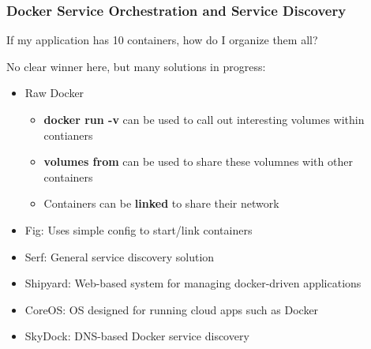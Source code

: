 \documentclass[xcolor=dvipsnames]{beamer}
\newcommand{\cpause}{}
\begin{document}
\begin{frame}
  \frametitle{Docker Service Orchestration and Service Discovery}

  If my application has 10 containers, how do I organize them all? \cpause

  No clear winner here, but many solutions in progress: \cpause
  \begin{itemize}
    \item Raw Docker 
      \begin{itemize}
      \item \textbf{docker run -v} can be used to call out interesting volumes within contianers
      \item \textbf{volumes from} can be used to share these volumnes with other containers
      \item Containers can be \textbf{linked} to share their network
      \end{itemize}
      \cpause
    \item Fig: Uses simple config to start/link containers \cpause
    \item Serf: General service discovery solution \cpause
    \item Shipyard: Web-based system for managing docker-driven applications \cpause
    \item CoreOS: OS designed for running cloud apps such as Docker \cpause
    \item SkyDock: DNS-based Docker service discovery
  \end{itemize}
\end{frame}
\end{document}
